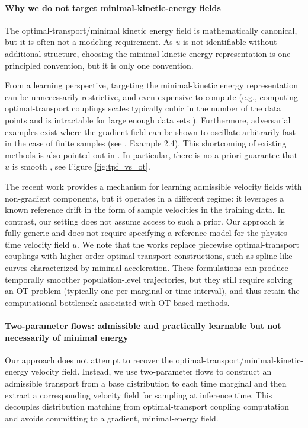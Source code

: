 \documentclass{article}
\theoremstyle{definition}
\theoremstyle{plain}
\theoremstyle{definition}
\theoremstyle{remark}
\begin{document}
\paragraph{Why we do not target minimal-kinetic-energy fields}
The optimal-transport/minimal kinetic energy field is mathematically canonical, but it is often not a modeling requirement. As $u$ is not identifiable without additional structure, choosing the minimal-kinetic energy representation is one principled convention, but it is only one convention.

From a learning perspective, targeting the minimal-kinetic energy representation can be unnecessarily restrictive, and even expensive to compute (e.g., computing optimal-transport couplings scales typically cubic in the number of the data points and is intractable for large enough data sets \citep[Section C.2]{persiianov_learning_2025}). Furthermore, adversarial examples exist where the gradient field can be shown to oscillate arbitrarily fast in the case of finite samples (see \citet{gigli_second_2011}, Example 2.4). This shortcoming of existing methods is also pointed out in \citep[Section G2]{terpin_2024_learning}. In particular, there is no a priori guarantee that $u$ is smooth \citep[Section 6.2]{ambrosio_gradient_2005}, see Figure \ref{fig:tpf_vs_ot}.

The recent work \cite{petrovic_curly_2025} provides a mechanism for learning admissible velocity fields with non-gradient components, but it operates in a different regime: it leverages a known reference drift in the form of sample velocities in the training data. In contrast, our setting does not assume access to such a prior. Our approach is fully generic and does not require specifying a reference model for the physics-time velocity field $u$. We note that the works \cite{benamou_second-order_2019, chewi_fast_2021} replace piecewise optimal-transport couplings with higher-order optimal-transport constructions, such as spline-like curves characterized by minimal acceleration. These formulations can produce temporally smoother population-level trajectories, but they still require solving an OT problem (typically one per marginal or time interval), and thus retain the computational bottleneck associated with OT-based methods.


\vspace*{-0.35cm}\paragraph{Two-parameter flows: admissible and practically learnable but not necessarily of minimal energy}
Our approach does not attempt to recover the optimal-transport/minimal-kinetic-energy velocity field. Instead, we use two-parameter flows to construct an admissible transport from a base distribution to each time marginal and then extract a corresponding velocity field for sampling at inference time. This decouples distribution matching from optimal-transport coupling computation and avoids committing to a gradient, minimal-energy field.
\end{document}
